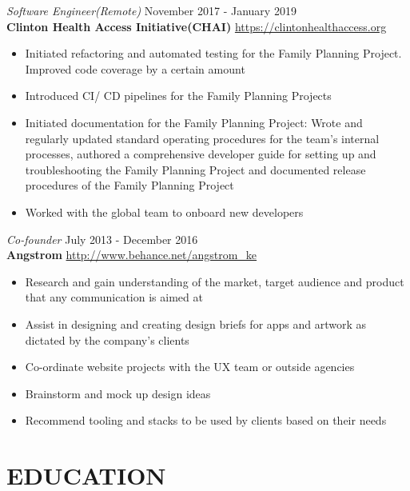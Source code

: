 \documentclass[margin, line]{res} %
\begin{document}
\clearpage
    {\sl Software Engineer(Remote)} \hfill November 2017 - January 2019 \\
    \textbf{Clinton Health Access Initiative(CHAI)} \hfill \url{https://clintonhealthaccess.org}
    \begin{itemize} \itemsep -2pt %
    \item Initiated refactoring and automated testing for the Family Planning Project. Improved code coverage by a certain amount
    \item Introduced CI/ CD pipelines for the Family Planning Projects
    \item Initiated documentation for the Family Planning Project: Wrote and regularly updated standard operating procedures for the team's internal processes, authored a comprehensive developer guide for setting up and troubleshooting the Family Planning Project and documented release procedures of the Family Planning Project
    \item Worked with the global team to onboard new developers
    \end{itemize}

    {\sl Co-founder} \hfill July 2013 - December 2016\\
    \textbf{Angstrom} \hfill \url{http://www.behance.net/angstrom_ke}
    \begin{itemize} \itemsep -2pt %
    \item Research and gain understanding of the market, target audience and product that any communication is aimed at
    \item Assist in designing and creating design briefs for apps and artwork as dictated by the company's clients
    \item Co-ordinate website projects with the UX team or outside agencies
    \item Brainstorm and mock up design ideas
    \item Recommend tooling and stacks to be used by clients based on their needs
    \end{itemize}

    \section{EDUCATION}
\end{document}
